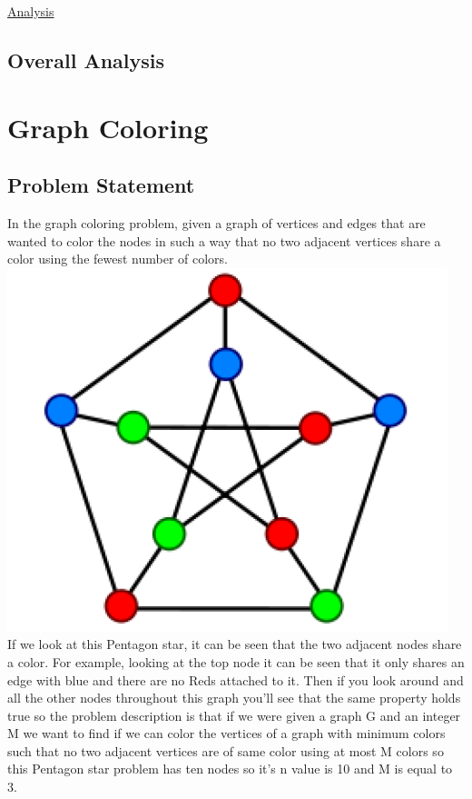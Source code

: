\documentclass[11pt, letterpaper]{article}
\begin{document}
\underline{Analysis}

\subsection {Overall Analysis}

\newpage

\section{Graph Coloring}
\subsection {Problem Statement}
In the graph coloring problem, given a graph of vertices and edges that are wanted to color the
nodes in such a way that no two adjacent vertices share a color using the fewest number of colors.
\includegraphics[scale=0.8]{images/graphCol.PNG}\\[1cm]
If we look at this Pentagon star, it can be seen that the two adjacent nodes share a color. For 
example, looking at the top node it can be seen that it only shares an edge with blue and there 
are no Reds attached to it. Then if you look around and all the other nodes throughout this graph 
you'll see that the same property holds true so the problem description is that if we were given a 
graph G and an integer M we want to find if we can color the vertices of a graph with minimum 
colors such that no two adjacent vertices are of same color using at most M colors so this Pentagon 
star problem has ten nodes so it's n value is 10 and M is equal to 3.\\
\end{document}
